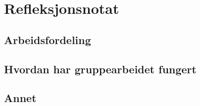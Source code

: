 \section{Refleksjonsnotat}
\subsection{Arbeidsfordeling}
\subsection{Hvordan har gruppearbeidet fungert}
\subsection{Annet}